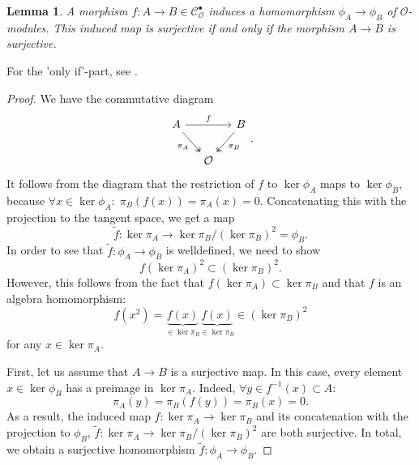 \documentclass{article}
\theoremstyle{plain}%
\newtheorem{lemma}[theorem]{Lemma}
\theoremstyle{definition}
\theoremstyle{remark}
\newcommand{\cob}{\mathcal{C}_\mathcal{O}^\bullet}
\begin{document}
\begin{lemma}\label{lem:surjectivity_phi}
    A morphism \(f\colon A \to B \in \cob\) induces a homomorphism \(\phi_A \to \phi_B\) of \(\mathcal{O}\)-modules.
    This induced map is surjective if and only if the morphism \(A \to B\) is surjective.
\end{lemma}
For the 'only if'-part, see \cites[lemma 5.5]{Darmon1995}[theorem 8.4]{Matsumura1986}%
[ch. II, lemma 7.4]{Hartshorne1977}[\href{https://stacks.math.columbia.edu/tag/090T}{section 090T}]{stacks-project}.
\begin{proof}
    We have the commutative diagram
    \[
    \begin{tikzcd}[column sep=small]
        A \arrow[rr, "f"] \arrow [dr, "\pi_A", swap, twoheadrightarrow] & & B \arrow [dl, "\pi_B", twoheadrightarrow]\\
        & \mathcal{O} &
    \end{tikzcd}.
    \]
    It follows from the diagram that the restriction of \(f\) to \(\ker \phi_A\) maps to \(\ker \phi_B\),
    because \(\forall x \in \ker \phi_A\colon\; \pi_B(f(x)) = \pi_A(x) = 0\).
    Concatenating this with the projection to the tangent space, we get a map
    \[
        \tilde f\colon \ker \pi_A \to \ker \pi_B/(\ker \pi_B)^2 = \phi_B.
    \]
    In order to see that \(\tilde f\colon \phi_A \to \phi_B\) is welldefined, we need to show 
    \[
        f(\ker \pi_A)^2 \subset (\ker \pi_B)^2.
    \]
    However, this follows from the fact that \(f(\ker \pi_A) \subset \ker \pi_B\) and that \(f\) is an algebra
    homomorphism:
    \[
        f(x^2) = \underbrace{f(x)}_{\in \ker \pi_B}\underbrace{f(x)}_{\in \ker \pi_B} \in (\ker \pi_B)^2 
    \]
    for any \(x \in \ker \pi_A\).

    First, let us assume that \(A \to B\) is a surjective map.
    In this case, every element \(x \in \ker \phi_B\) has a preimage in \(\ker \pi_A\). 
    Indeed, \(\forall y \in f^{-1}(x)\subset A\colon\)
    \[
        \pi_A(y) = \pi_B(f(y)) = \pi_B(x) = 0.
    \]
    As a result, the induced map \(f\colon \ker \pi_A \to \ker \pi_B\) and its concatenation with
    the projection to \(\phi_B\), \(\tilde f\colon \ker \pi_A \to \ker \pi_B/(\ker \pi_B)^2\) are both surjective.
    In total, we obtain a surjective homomorphism \(\tilde f\colon \phi_A \to \phi_B\).
    

\end{proof}
\end{document}
